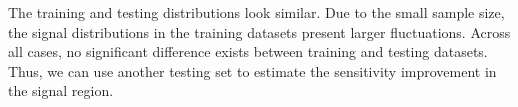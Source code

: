 \documentclass[12pt]{article}
\begin{document}
        The training and testing distributions look similar. Due to the small sample size, the signal distributions in the training datasets present larger fluctuations. Across all cases, no significant difference exists between training and testing datasets. Thus, we can use another testing set to estimate the sensitivity improvement in the signal region.
        \begin{figure}[htpb]
            \centering
             \\
\end{figure}
\end{document}
